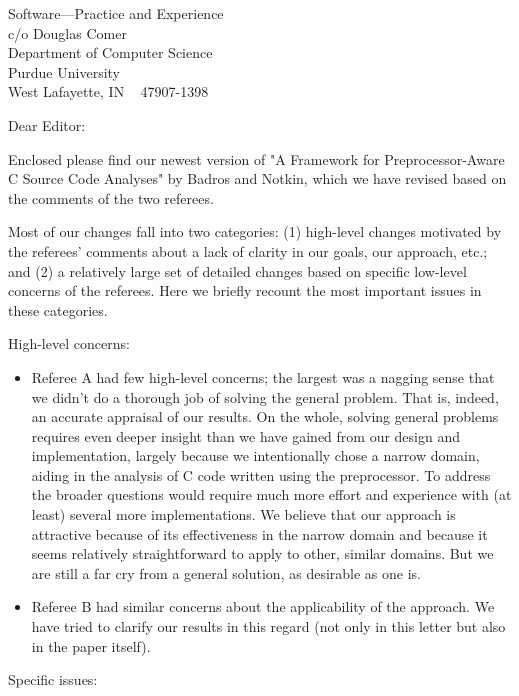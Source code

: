 \documentclass{letter}
\begin{document}
\begin{letter}{
Software---Practice and Experience \\
c/o Douglas Comer \\
Department of Computer Science \\
Purdue University \\
West Lafayette, IN ~ 47907-1398}

\opening{Dear Editor:}

Enclosed please find our newest version of "A Framework for
Preprocessor-Aware C Source Code Analyses" by Badros and Notkin, which we
have revised based on the comments of the two referees.

Most of our changes fall into two categories: (1) high-level changes
motivated by the referees' comments about a lack of clarity in our
goals, our approach, etc.; and (2) a relatively large set of detailed
changes based on specific low-level concerns of the referees.  Here we
briefly recount the most important issues in these categories.

High-level concerns:

\begin{itemize}

\item Referee A had few high-level concerns; the largest was a nagging
sense that we didn't do a thorough job of solving the general problem.  That
is, indeed, an accurate appraisal of our results.  On the whole, solving
general problems requires even deeper insight than we have gained from our
design and implementation, largely because we intentionally chose a narrow
domain, aiding in the analysis of C code written using the preprocessor.  To
address the broader questions would require much more effort and experience
with (at least) several more implementations.  We believe that our approach
is attractive because of its effectiveness in the narrow domain and because
it seems relatively straightforward to apply to other, similar domains.  But
we are still a far cry from a general solution, as desirable as one is.

\item Referee B had similar concerns about the applicability of the
approach.  We have tried to clarify our results in this regard (not only in
this letter but also in the paper itself).

\end{itemize}

Specific issues:

\begin{itemize}


\end{itemize}
\end{letter}
\end{document}
